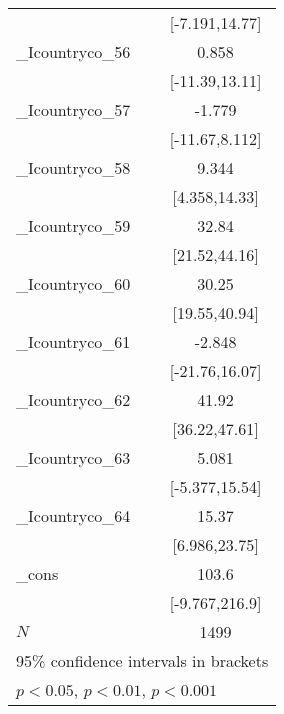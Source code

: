 {\begin{tabular}{l*{1}{c}}
            &        [-7.191,14.77]         \\
[1em]
\_Icountryco\_56&                 0.858         \\
            &        [-11.39,13.11]         \\
[1em]
\_Icountryco\_57&                -1.779         \\
            &        [-11.67,8.112]         \\
[1em]
\_Icountryco\_58&                 9.344\sym{***}\\
            &         [4.358,14.33]         \\
[1em]
\_Icountryco\_59&                 32.84\sym{***}\\
            &         [21.52,44.16]         \\
[1em]
\_Icountryco\_60&                 30.25\sym{***}\\
            &         [19.55,40.94]         \\
[1em]
\_Icountryco\_61&                -2.848         \\
            &        [-21.76,16.07]         \\
[1em]
\_Icountryco\_62&                 41.92\sym{***}\\
            &         [36.22,47.61]         \\
[1em]
\_Icountryco\_63&                 5.081         \\
            &        [-5.377,15.54]         \\
[1em]
\_Icountryco\_64&                 15.37\sym{***}\\
            &         [6.986,23.75]         \\
[1em]
\_cons      &                 103.6         \\
            &        [-9.767,216.9]         \\
\hline
\(N\)       &                  1499         \\
\hline\hline
\multicolumn{2}{l}{\footnotesize 95\% confidence intervals in brackets}\\
\multicolumn{2}{l}{\footnotesize \sym{*} \(p<0.05\), \sym{**} \(p<0.01\), \sym{***} \(p<0.001\)}\\
\end{tabular}
}

